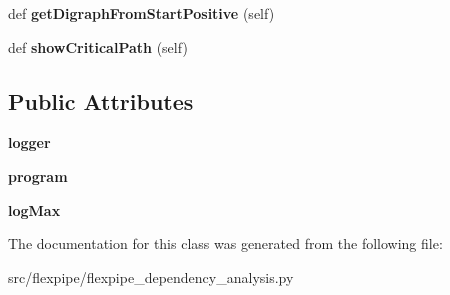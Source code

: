 \begin{DoxyCompactItemize}
\item 
\hypertarget{classmapper_1_1src_1_1flexpipe_1_1flexpipe__dependency__analysis_1_1_flexpipe_dependency_analysis_ae636e37d774f03946d8e10885a05ca5a}{}def {\bfseries get\+Digraph\+From\+Start\+Positive} (self)\label{classmapper_1_1src_1_1flexpipe_1_1flexpipe__dependency__analysis_1_1_flexpipe_dependency_analysis_ae636e37d774f03946d8e10885a05ca5a}

\item 
\hypertarget{classmapper_1_1src_1_1flexpipe_1_1flexpipe__dependency__analysis_1_1_flexpipe_dependency_analysis_a1512fb4e2f30235d017282104cbcde0b}{}def {\bfseries show\+Critical\+Path} (self)\label{classmapper_1_1src_1_1flexpipe_1_1flexpipe__dependency__analysis_1_1_flexpipe_dependency_analysis_a1512fb4e2f30235d017282104cbcde0b}

\end{DoxyCompactItemize}
\subsection*{Public Attributes}
\begin{DoxyCompactItemize}
\item 
\hypertarget{classmapper_1_1src_1_1flexpipe_1_1flexpipe__dependency__analysis_1_1_flexpipe_dependency_analysis_a42d048d684101817d06e190a4f459d10}{}{\bfseries logger}\label{classmapper_1_1src_1_1flexpipe_1_1flexpipe__dependency__analysis_1_1_flexpipe_dependency_analysis_a42d048d684101817d06e190a4f459d10}

\item 
\hypertarget{classmapper_1_1src_1_1flexpipe_1_1flexpipe__dependency__analysis_1_1_flexpipe_dependency_analysis_a00e4fa144fe632800624ed3b5ec34224}{}{\bfseries program}\label{classmapper_1_1src_1_1flexpipe_1_1flexpipe__dependency__analysis_1_1_flexpipe_dependency_analysis_a00e4fa144fe632800624ed3b5ec34224}

\item 
\hypertarget{classmapper_1_1src_1_1flexpipe_1_1flexpipe__dependency__analysis_1_1_flexpipe_dependency_analysis_aa413ba78328c209aceaef72de1f0c304}{}{\bfseries log\+Max}\label{classmapper_1_1src_1_1flexpipe_1_1flexpipe__dependency__analysis_1_1_flexpipe_dependency_analysis_aa413ba78328c209aceaef72de1f0c304}

\end{DoxyCompactItemize}


The documentation for this class was generated from the following file\+:\begin{DoxyCompactItemize}
\item 
src/flexpipe/flexpipe\+\_\+dependency\+\_\+analysis.\+py\end{DoxyCompactItemize}
